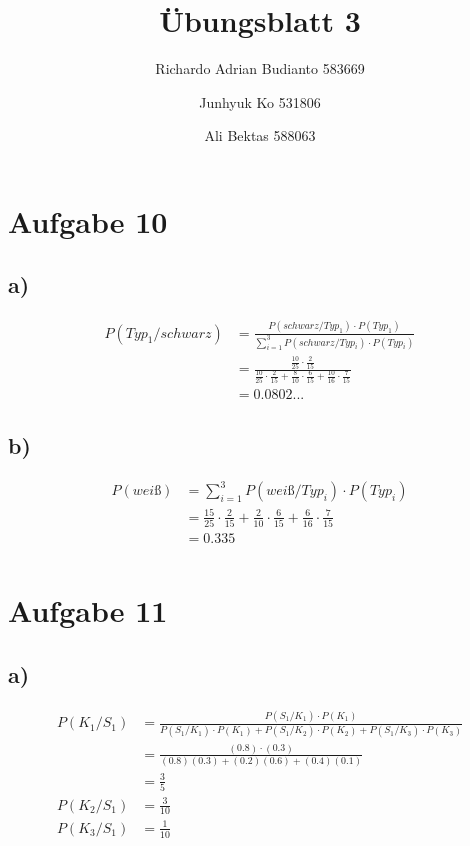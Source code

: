 \documentclass{article}
\title{Übungsblatt 3}
\author{Richardo Adrian Budianto  583669 \and Junhyuk Ko  531806 \and Ali Bektas 588063 }
\begin{document}
\maketitle



\section*{Aufgabe 10}
\subsection*{a)}

\begin{align*}
P(Typ_1 / schwarz) &= \frac{P(schwarz / Typ_1) \cdot P(Typ_1)}{\sum_{i=1}^{3}{P(schwarz / Typ_i ) \cdot P(Typ_i) }} \\
&= \frac{ \frac{10}{25} \cdot \frac{2}{15}}{ \frac{10}{25} \cdot \frac{2}{15} + \frac{8}{10} \cdot \frac{6}{15} + \frac{10}{16} \cdot \frac{7}{15}}\\
&= 0.0802...
\end{align*}

\subsection*{b)}

\begin{align*}
P(weiß) &= \sum_{i=1}^{3}{P(weiß / Typ_i)\cdot P(Typ_i)} \\
&= \frac{15}{25} \cdot \frac{2}{15} + \frac{2}{10} \cdot \frac{6}{15} + \frac{6}{16} \cdot \frac{7}{15} \\
&= 0.335 \\
\end{align*}

\section*{Aufgabe 11}
\subsection*{a)}

\begin{align*}
P(K_1 / S_1) &= \frac{P(S_1 / K_1)\cdot P(K_1)}{P(S_1 / K_1)\cdot P(K_1) + P(S_1 / K_2)\cdot P(K_2) + P(S_1 / K_3)\cdot P(K_3)} \\
&= \frac{(0.8)\cdot(0.3)}{(0.8)(0.3) + (0.2)(0.6) + (0.4)(0.1)} \\
&= \frac{3}{5} \\
P(K_2 / S_1) &=  \frac{3}{10}\\
P(K_3 / S_1) &= \frac{1}{10}\\
\end{align*}
\end{document}
